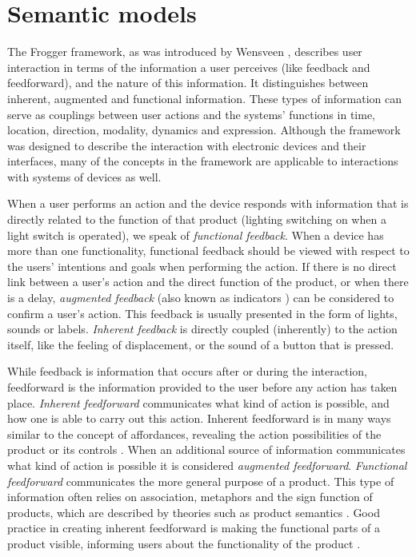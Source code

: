 	

\section{Semantic models}
%
\label{interactionFrogger}
The Frogger framework, as was introduced by Wensveen \cite{Wensveen2005}, describes user interaction in terms of the information a user perceives (like feedback and feedforward), and the nature of this information. It distinguishes between inherent, augmented and functional information. These types of information can serve as couplings between user actions and the systems' functions in time, location, direction, modality, dynamics and expression. Although the framework was designed to describe the interaction with electronic devices and their interfaces, many of the concepts in the framework are applicable to interactions with systems of devices as well.

When a user performs an action and the device responds with information that is directly related to the function of that product (lighting switching on when a light switch is operated), we speak of \emph{functional feedback}. When a device has more than one functionality, functional feedback should be viewed with respect to the users' intentions and goals when performing the action. If there is no direct link between a user's action and the direct function of the product, or when there is a delay, \emph{augmented feedback} (also known as indicators \cite{Thimbleby2007}) can be considered to confirm a user's action. This feedback is usually presented in the form of lights, sounds or labels. \emph{Inherent feedback} is directly coupled (inherently) to the action itself, like the feeling of displacement, or the sound of a button that is pressed.

While feedback is information that occurs after or during the interaction, feedforward is the information provided to the user before any action has taken place. \emph{Inherent feedforward} communicates what kind of action is possible, and how one is able to carry out this action. Inherent feedforward is in many ways similar to the concept of affordances, revealing the action possibilities of the product or its controls \cite{Wensveen2005}. When an additional source of information communicates what kind of action is possible it is considered \emph{augmented feedforward}.  
\emph{Functional feedforward} communicates the more general purpose of a product. This type of information often relies on association, metaphors and the sign function of products, which are described by theories such as product semantics \cite{Krippendorff2006}. Good practice in creating inherent feedforward is making the functional parts of a product visible, informing users about the functionality of the product \cite{Norman1998}.	

